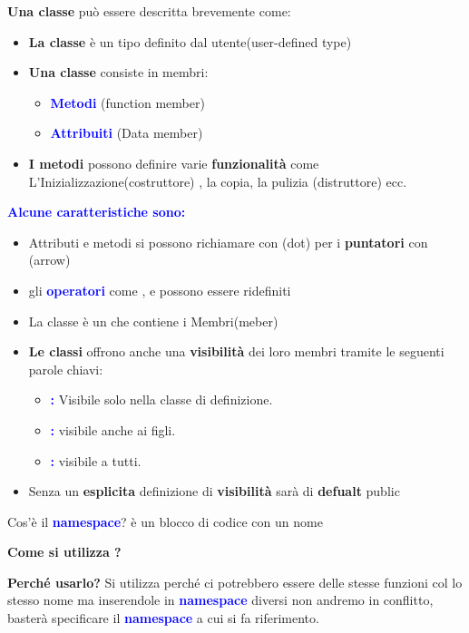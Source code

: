 \textbf{Una classe} può essere descritta brevemente come:
\begin{itemize}
    \item \textbf{La classe} è un tipo definito dal utente(user-defined type)
    \item  \textbf{Una classe} consiste in membri:
    \begin{itemize}
        \item \textbf{\textcolor{blue}{Metodi}} (function member)
        \item \textbf{\textcolor{blue}{Attribuiti}} (Data member)
    \end{itemize}
    \item \textbf{I metodi} possono definire varie \textbf{funzionalità} come L'Inizializzazione(costruttore) , la copia, la pulizia (distruttore) ecc.
\end{itemize}
\textbf{\textcolor{blue}{Alcune caratteristiche sono:}}
\begin{itemize}
    \item Attributi e metodi si possono richiamare con \textbf{\textcolor{blue}{}}(dot) per i \textbf{puntatori} con \textbf{\textcolor{blue}{\code{->}}}(arrow)
    \item gli \textcolor{blue}{\textbf{operatori}} come \textcolor{blue}{\textbf{\code{+}}},\textcolor{blue}{\textbf{\code{!}}} e \textcolor{blue}{\textbf{\code{[]}}} possono essere ridefiniti
    \item La classe è un \textcolor{blue}{\textbf{}} che contiene i Membri(meber)
    \item \textbf{Le classi} offrono anche una \textbf{visibilità} dei loro membri tramite le seguenti parole chiavi:
    \begin{itemize}
        \item \textbf{\textcolor{blue}{:}} Visibile solo nella classe di definizione.
        \item \textbf{\textcolor{blue}{:}} visibile anche ai figli.
        \item \textbf{\textcolor{blue}{:}} visibile a tutti.
    \end{itemize}
    \item Senza un \textbf{esplicita} definizione di \textbf{visibilità} sarà di \textbf{defualt} public
    
\end{itemize}
\begin{tcolorbox}[width=12cm, boxsep=10pt]
    Cos'è il \textcolor{blue}{\textbf{namespace}}? è un blocco di codice con un nome
    
    \textbf{Come si utilizza ?}
    
    \textbf{Perché usarlo?}
    Si utilizza perché ci potrebbero essere delle stesse funzioni col lo stesso nome ma inserendole in \textcolor{blue}{\textbf{namespace}} diversi non andremo in conflitto, basterà specificare il \textcolor{blue}{\textbf{namespace}} a cui si fa riferimento.      
\end{tcolorbox}
